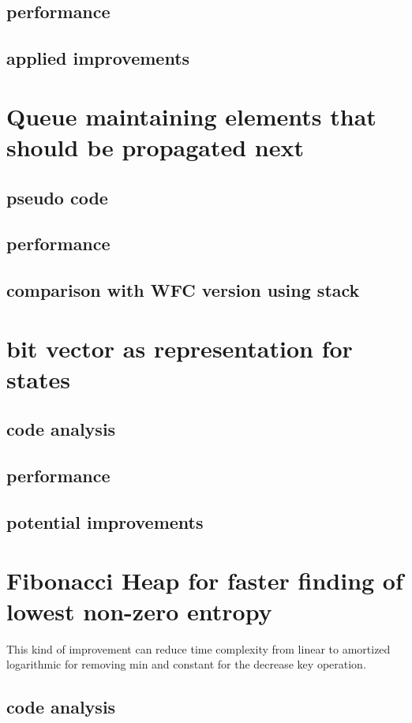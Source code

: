 \documentclass[shortabstract, english, inz]{iithesis}
\begin{document}
        \subsection{performance}
        \subsection{applied improvements}
    \section{Queue maintaining elements that should be propagated next}
    \label{queue}
        \subsection{pseudo code}
        \subsection{performance}
        \subsection{comparison with WFC version using stack}
        \label{stack_vs_queue}
    \section{bit vector as representation for states}
        \label{bitwise}
        \subsection{code analysis}
        \subsection{performance}
        \subsection{potential improvements}
    \section{Fibonacci Heap for faster finding of lowest non-zero entropy}
    \label{fibheap}
    This kind of improvement can reduce time complexity from linear to amortized logarithmic for removing min and constant for the decrease key operation.
        \subsection{code analysis}
\end{document}
